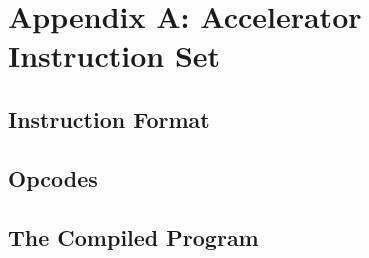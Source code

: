 %
\chapter*{Appendix A: Accelerator Instruction Set}
\label{appendix:isa}

\section{Instruction Format}
\label{sec:isa-encoding}

\section{Opcodes}
\label{sec:isa-opcodes}

\section{The Compiled Program}
\label{sec:isa-program}
